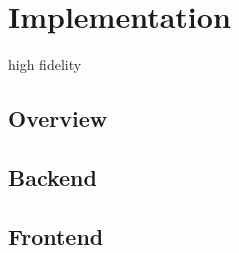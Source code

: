 \section{Implementation}

high fidelity

    \subsection{Overview}

    \subsection{Backend}

    \subsection{Frontend}
